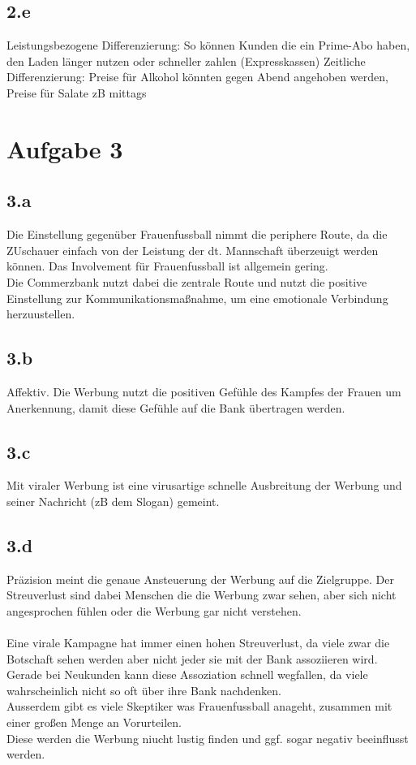 \subsection{2.e}
    Leistungsbezogene Differenzierung: So können Kunden die ein Prime-Abo haben, den Laden länger nutzen oder schneller zahlen (Expresskassen)
    Zeitliche Differenzierung: Preise für Alkohol könnten gegen Abend angehoben werden, Preise für Salate zB mittags



\section{Aufgabe 3}
\subsection{3.a}
    Die Einstellung gegenüber Frauenfussball nimmt die periphere Route, da die ZUschauer einfach von der Leistung der dt. Mannschaft überzeuigt werden können. Das Involvement für Frauenfussball ist allgemein gering. \\
    Die Commerzbank nutzt dabei die zentrale Route und nutzt die positive Einstellung zur Kommunikationsmaßnahme, um eine emotionale Verbindung herzuustellen.

\subsection{3.b}
    Affektiv. Die Werbung nutzt die positiven Gefühle des Kampfes der Frauen um Anerkennung, damit diese Gefühle auf die Bank übertragen werden.

\subsection{3.c}
    Mit viraler Werbung ist eine virusartige schnelle Ausbreitung der Werbung und seiner Nachricht (zB dem Slogan) gemeint.

\subsection{3.d}
    Präzision meint die genaue Ansteuerung der Werbung auf die Zielgruppe. Der Streuverlust sind dabei Menschen die die Werbung zwar sehen, aber sich nicht angesprochen fühlen oder die Werbung gar nicht verstehen. \\
    \ \\
    Eine virale Kampagne hat immer einen hohen Streuverlust, da viele zwar die Botschaft sehen werden aber nicht jeder sie mit der Bank assoziieren wird. Gerade bei Neukunden kann diese Assoziation schnell wegfallen, da viele wahrscheinlich nicht so oft über ihre Bank nachdenken. \\
    Ausserdem gibt es viele Skeptiker was Frauenfussball anageht, zusammen mit einer großen Menge an Vorurteilen. \\
    Diese werden die Werbung niucht lustig finden und ggf. sogar negativ beeinflusst werden. \\

